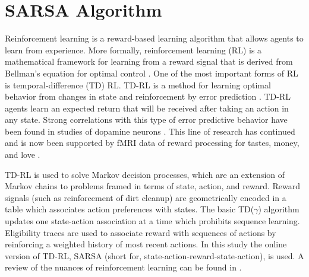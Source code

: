 \section{SARSA Algorithm}
Reinforcement learning is a reward-based learning algorithm that allows agents
to learn from experience. More formally, reinforcement
learning (RL) is a mathematical framework for learning from a reward signal that
is derived from Bellman's equation for optimal control \cite{sutton1998introduction}. One of
the most important forms of RL is temporal-difference (TD) RL. TD-RL is a method
for learning optimal behavior from changes in state and reinforcement by error
prediction \cite{sutton1988learning}. TD-RL agents learn an expected return that will be
received after taking an action in any state. Strong correlations with this type of
error predictive behavior have been found in studies of dopamine neurons
\cite{schultz1993responses}. This line of research has continued and is now been
supported by fMRI data of reward processing for tastes, money, and love
\cite{haber2009reward}.

TD-RL is used to solve Markov decision processes, which are an extension of
Markov chains to problems framed in terms of state, action, and reward.
Reward signals (such as reinforcement of dirt cleanup) are geometrically encoded
in a table which associates action preferences with states. The basic
TD($\gamma$) algorithm updates one state-action association at a time which
prohibits sequence learning. Eligibility traces are used to associate reward
with sequences of actions by reinforcing a weighted history of most recent
actions. In this study the online version of TD-RL, SARSA (short for,
state-action-reward-state-action), is used. A review of the nuances of
reinforcement learning can be found in \cite{sutton1998introduction}.


